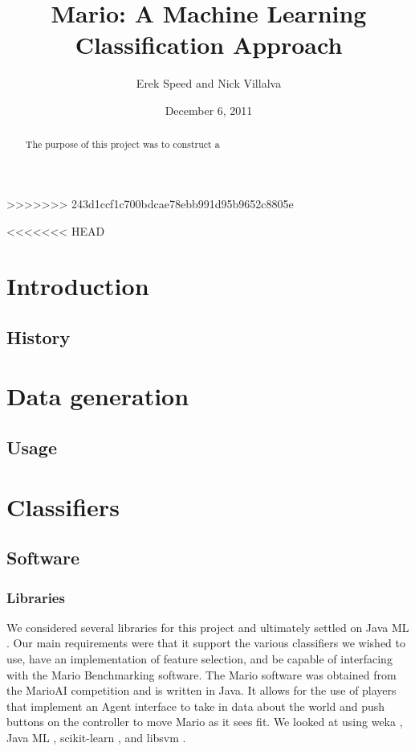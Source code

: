 \documentclass[]{article}   %
\begin{document}
\title{Mario: A Machine Learning Classification Approach}   %

\author{Erek Speed and Nick Villalva}         %
>>>>>>> 243d1ccf1c700bdcae78ebb991d95b9652c8805e
\date{December 6, 2011}    %
\maketitle

\begin{abstract}
 The purpose of this project was to construct a 
\end{abstract}


<<<<<<< HEAD
\section{Introduction}     %
\subsection{History}       %

\section{Data generation}     %
\subsection{Usage}         %

\section{Classifiers}
\subsection{Software}
\subsubsection{Libraries}
We considered several libraries for this project and ultimately settled on Java ML \cite{javaml}. Our main requirements were that it support the various classifiers we wished to use, have an implementation of feature selection, and be capable of interfacing with the Mario Benchmarking \cite{mariobenchmark} software. The Mario software was obtained from the MarioAI competition and is written in Java. It allows for the use of players that implement an Agent interface to take in data about the world and push buttons on the controller to move Mario as it sees fit. We looked at using weka \cite{weka}, Java ML \cite{javaml}, scikit-learn \cite{scikit}, and libsvm \cite{libsvm}. 
\end{document}
